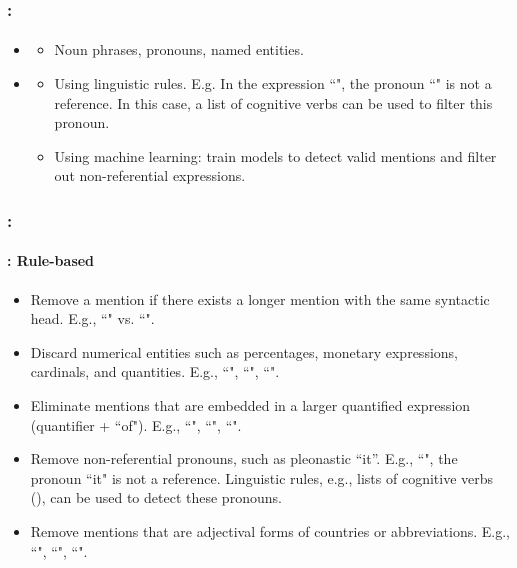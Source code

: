 \documentclass[xcolor=table]{beamer}
\begin{document}
\begin{frame}
	\frametitle{\insertshortsubtitle: \insertsection}
	\framesubtitle{\insertsubsection}
	
	\begin{itemize}
		\item {}
		\begin{itemize}
			\item Noun phrases, pronouns, named entities.
		\end{itemize}
	
		\item {}
		\begin{itemize}
			\item Using linguistic rules. 
			E.g. In the expression ``", the pronoun ``" is not a reference. 
			In this case, a list of cognitive verbs  can be used to filter this pronoun.
			\item Using machine learning: train models to detect valid mentions and filter out non-referential expressions.
		\end{itemize}
	
	\end{itemize}
	
\end{frame}


\begin{frame}
	\frametitle{\insertshortsubtitle: \insertsection}
	\framesubtitle{\insertsubsection: Rule-based \cite{2013-lee-al}}
	
	\begin{itemize}
		\item Remove a mention if there exists a longer mention with the same syntactic head.
		E.g., ``" vs. ``". 
		
		\item Discard numerical entities such as percentages, monetary expressions, cardinals, and quantities.
		E.g., ``", ``", ``".
		
		\item Eliminate mentions that are embedded in a larger quantified expression (quantifier + ``of"). 
		E.g., ``", ``", ``".
		
		\item Remove non-referential pronouns, such as pleonastic ``it''.
		E.g., ``", the pronoun ``it" is not a reference. 
		Linguistic rules, e.g., lists of cognitive verbs (), can be used to detect these pronouns.
		
		\item Remove mentions that are adjectival forms of countries or abbreviations.
		E.g., ``", ``", ``".
		
	\end{itemize}
	
\end{frame}
\end{document}
